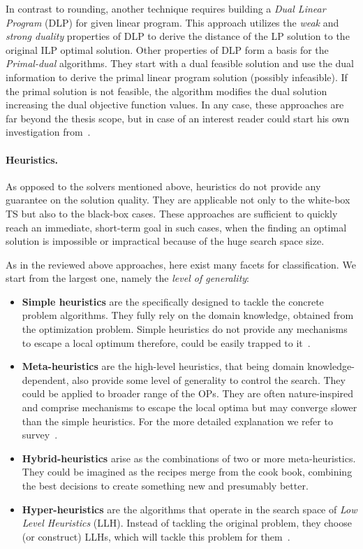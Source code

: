 In contrast to rounding, another technique requires building a \emph{Dual Linear Program} (DLP) for given linear program. This approach utilizes the \emph{weak} and \emph{strong duality} properties of DLP to derive the distance of the LP solution to the original ILP optimal solution. Other properties of DLP form a basis for the \emph{Primal-dual} algorithms. They start with a dual feasible solution and use the dual information to derive the primal linear program solution (possibly infeasible). If the primal solution is not feasible, the algorithm modifies the dual solution increasing the dual objective function values. In any case, these approaches are far beyond the thesis scope, but in case of an interest reader could start his own investigation from~\cite{williamson2011design}. 

\paragraph{Heuristics.} As opposed to the solvers mentioned above, heuristics do not provide any guarantee on the solution quality. They are applicable not only to the white-box TS but also to the black-box cases. These approaches are sufficient to quickly reach an immediate, short-term goal in such cases, when the finding an optimal solution is impossible or impractical because of the huge search space size.

As in the reviewed above approaches, here exist many facets for classification.
We start from the largest one, namely the \textit{level of generality}:
\begin{itemize}
	\item \textbf{Simple heuristics} are the specifically designed to tackle the concrete problem algorithms. They fully rely on the domain knowledge, obtained from the optimization problem. Simple heuristics do not provide any mechanisms to escape a local optimum therefore, could be easily trapped to it~\cite{pearl1984intelligent}.
	
	\item \textbf{Meta-heuristics} are the high-level heuristics, that being domain knowledge-dependent, also provide some level of generality to control the search. They could be applied to broader range of the OPs. They are often nature-inspired and comprise mechanisms to escape the local optima but may converge slower than the simple heuristics. For the more detailed explanation we refer to survey~\cite{bianchi2009survey}.
	
	\item \textbf{Hybrid-heuristics} arise as the combinations of two or more meta-heuristics. They could be imagined as the recipes merge from the cook book, combining the best decisions to create something new and presumably better.
	
	\item \textbf{Hyper-heuristics} are the algorithms that operate in the search space of \emph{Low Level Heuristics} (LLH). Instead of tackling the original problem, they choose (or construct) LLHs, which will tackle this problem for them~\cite{burke2003hyper}. 
\end{itemize}

